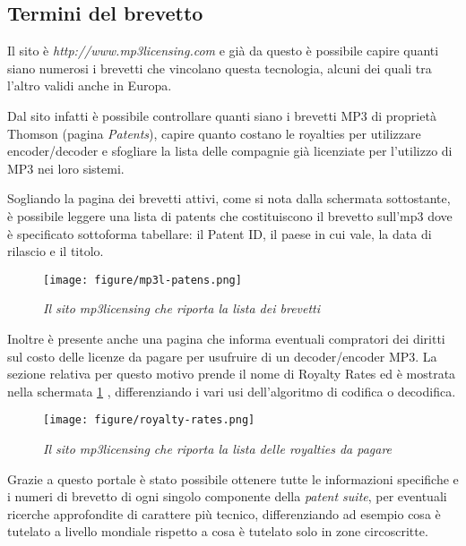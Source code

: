 \subsection{Termini del brevetto}
Il sito è  \textit{http://www.mp3licensing.com} e già da questo è possibile capire quanti siano numerosi i brevetti che vincolano questa tecnologia, alcuni dei quali tra l'altro validi anche in Europa. 

Dal sito infatti è possibile controllare quanti siano i brevetti MP3 di proprietà Thomson (pagina \textit{Patents}), capire quanto costano le royalties per utilizzare encoder/decoder e sfogliare la lista delle compagnie già licenziate per l'utilizzo di MP3 nei loro sistemi.

Sogliando la pagina dei brevetti attivi, come si nota dalla schermata sottostante, è possibile leggere una lista di patents che costituiscono il brevetto sull'mp3 dove è specificato sottoforma tabellare: il Patent ID, il paese in cui vale, la data di rilascio e il titolo. 
\begin{figure}[h]
	\begin{center}
		\texttt{[image: figure/mp3l-patens.png]}
	\end{center}
	\caption{\textit{Il sito mp3licensing che riporta la lista dei brevetti}}
\end{figure}


Inoltre è presente anche una pagina che informa eventuali compratori dei diritti sul costo delle licenze da pagare per usufruire di un decoder/encoder MP3. La sezione relativa per questo motivo prende il nome di Royalty Rates ed è mostrata nella schermata \ref{fig:rr} , differenziando i vari usi dell'algoritmo di codifica o decodifica.

\begin{figure}[h] 
	\begin{center}
		\texttt{[image: figure/royalty-rates.png]}\label{fig:rr}
	\end{center}
	\caption{\textit{Il sito mp3licensing che riporta la lista delle royalties da pagare}}
\end{figure}


Grazie a questo portale è stato possibile ottenere tutte le informazioni specifiche e i numeri di brevetto di ogni singolo componente della \textit{patent suite}, per eventuali ricerche approfondite di carattere più tecnico, differenziando ad esempio cosa è tutelato a livello mondiale rispetto a cosa è tutelato solo in zone circoscritte.


